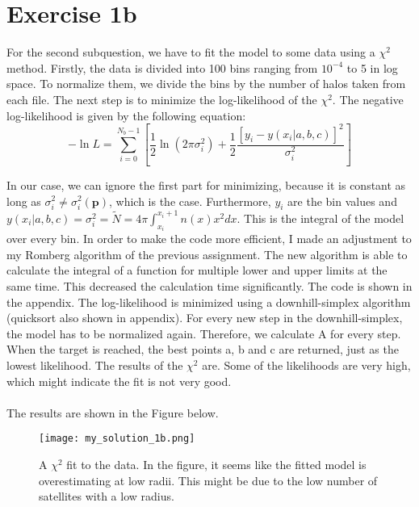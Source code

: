 \section{Exercise 1b}



For the second subquestion, we have to fit the model to some data using a $\chi^2$ method. Firstly, the data is divided into 100 bins ranging from $10^{-4}$ to 5 in log space. To normalize them, we divide the bins by the number of halos taken from each file. The next step is to minimize the log-likelihood of the $\chi^2$. The negative log-likelihood is given by the following equation: 
\begin{equation}
    -\ln{L} = \sum^{N_b-1}_{i = 0} \left[ \frac{1}{2} \ln(2\pi\sigma_i^2) +\frac{1}{2}\frac{[y_i - y(x_i|a,b,c)]^2}{\sigma_i^2}  \right]
\end{equation}

In our case, we can ignore the first part for minimizing, because it is constant as long as $\sigma_i^2 \neq \sigma_i^2(\textbf{p})$, which is the case. Furthermore, $y_i$ are the bin values and $y(x_i|a,b,c) = \sigma_i^2 = \tilde{N} = 4\pi\int^{x_i+1}_{x_i} n(x) x^2 dx$. This is the integral of the model over every bin. In order to make the code more efficient, I made an adjustment to my Romberg algorithm of the previous assignment. The new algorithm is able to calculate the integral of a function for multiple lower and upper limits at the same time. This decreased the calculation time significantly. The code is shown in the appendix. The log-likelihood is minimized using a downhill-simplex algorithm (quicksort also shown in appendix). For every new step in the downhill-simplex, the model has to be normalized again. Therefore, we calculate A for every step. When the target is reached, the best points a, b and c are returned, just as the lowest likelihood. The results of the $\chi^2$ are. Some of the likelihoods are very high, which might indicate the fit is not very good. 
\\
\\



The results are shown in the Figure below.

\begin{figure}[h!]
  \centering
  \texttt{[image: my\_solution\_1b.png]}
  \caption{A $\chi^2$ fit to the data. In the figure, it seems like the fitted model is overestimating at low radii. This might be due to the low number of satellites with a low radius.}
\end{figure}


